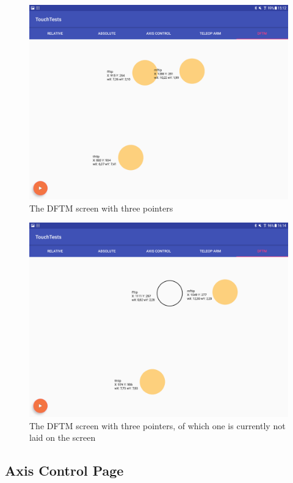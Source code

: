 \begin{figure}
	\caption{\label{fig:ui:dfmt}The DFTM screen with three pointers}
	\includegraphics[width=0.9\linewidth]{assets/chpt_impl/dftm}
\end{figure}

\begin{figure}
	\caption{\label{fig:ui:dfmt_lift}The DFTM screen with three pointers, of which one is currently not laid on the screen}
	\includegraphics[width=0.9\linewidth]{assets/chpt_impl/dftm_lifted}
\end{figure}

\subsection{Axis Control Page}

